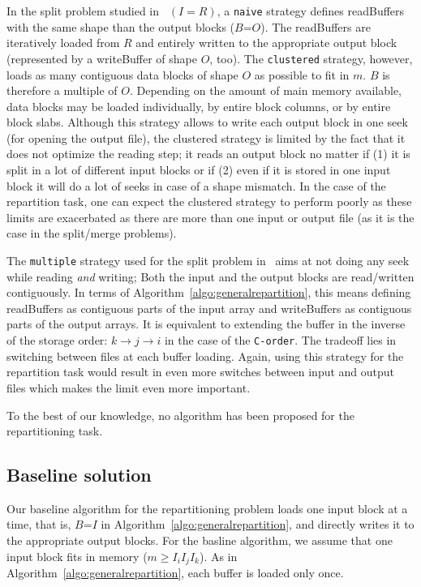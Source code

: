 \documentclass[conference]{IEEEtran}
\begin{document}
In the split problem studied in~\cite{seqalgorithms} $(I=R)$, a \texttt{naive}
strategy defines readBuffers with the same shape than the output blocks
($B$=$O$). The readBuffers are iteratively loaded from $R$ and entirely written
to the appropriate output block (represented by a writeBuffer of shape $O$, too).
The \texttt{clustered} strategy, however, loads as
many contiguous data blocks of shape $O$ as possible to fit in $m$.
$B$ is therefore a multiple of $O$.
Depending on the amount of main memory available, data blocks may be loaded
individually, by entire block columns, or by entire block slabs.
Although this strategy allows to write each output block in one seek
(for opening the output file), the clustered strategy is limited by the fact
that it does not optimize the reading step; it reads an output block no matter
if (1) it is split in a lot of different input blocks or if (2) even if it is stored
in one input block it will do a lot of seeks in case of a shape mismatch.
In the case of the repartition task, one can expect the clustered strategy to
perform poorly as these limits are exacerbated as there are more than one input or
output file (as it is the case in the split/merge problems).

The \texttt{multiple} strategy used for the split problem in~\cite{seqalgorithms}
aims at not doing any seek while reading \textit{and} writing;
Both the input and the output blocks are read/written contiguously. In
terms of Algorithm~\ref{algo:generalrepartition}, this means defining readBuffers as
contiguous parts of the input array and writeBuffers as contiguous parts of
the output arrays. It is equivalent to extending the buffer in the inverse of
the storage order: $k \rightarrow j \rightarrow i$ in the case
of the \texttt{C-order}. The tradeoff lies in switching between files
at each buffer loading. Again, using this strategy for the repartition task would
result in even more switches between input and output files which makes the limit
even more important.

To the best of our knowledge, no algorithm has been proposed for the
repartitioning task.

\subsection{Baseline solution}

Our baseline algorithm for the repartitioning problem loads one input block
at a time, that is, $B$=$I$ in
Algorithm~\ref{algo:generalrepartition}, and directly writes it to the appropriate output blocks.
For the basline algorithm, we assume that one input block fits in memory ($m \geq I_iI_jI_k$).
As in Algorithm~\ref{algo:generalrepartition}, each buffer is loaded only once.
\end{document}

